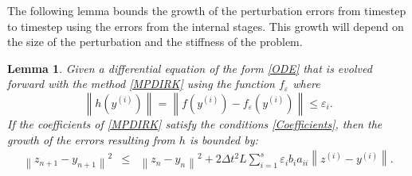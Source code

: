 \documentclass{siamart251104}
\newtheorem{lem}{Lemma}
\newcommand{\dt}{\Delta t}
\begin{document}
The following lemma  bounds  the growth of the perturbation errors from timestep to 
timestep using the errors from the internal stages. This growth will depend on the size 
of the perturbation and the stiffness  of the problem. 


\begin{lem} \label{lem1}
    Given a differential equation of the form \eqref{ODE}
    that is evolved forward with the 
method \eqref{MPDIRK} using the 
function $f_{\varepsilon}$  where
    \[ \left\| h(y^{(i)})\right\| = \left\|f(y^{(i)}) - f_{\varepsilon}(y^{(i)}) \right\| \leq \varepsilon_i. \]
If the coefficients of \eqref{MPDIRK}
satisfy the conditions \eqref{Coefficients},
then the growth of the errors resulting from  $h$
is bounded by:
  \begin{eqnarray}\label{boundMPcont}
\left\|z_{n+1} - y_{n+1}\right\|^2 &\leq & 
\left\|z_n - y_n\right\|^2  
+ 2 \dt^2 L  \sum_{i=1}^s \varepsilon_i b_{i} a_{ii} \left\| z^{(i)} -  y^{(i)} \right\|  .
    \end{eqnarray}
\end{lem}
\end{document}
